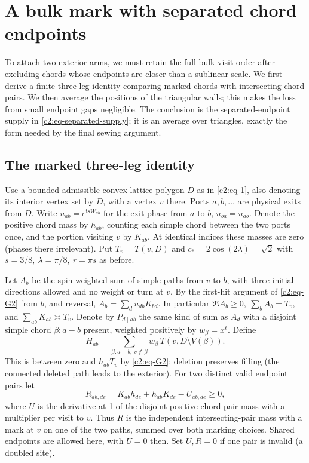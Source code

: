 \section{A bulk mark with separated chord endpoints}\label{c2:separated}

To attach two exterior arms, we must retain the full bulk-visit
order after excluding chords whose endpoints are closer than a sublinear
scale. We first derive a finite three-leg identity comparing marked
chords with intersecting chord pairs. We then average the positions of the
triangular walls; this makes the loss from small endpoint gaps negligible.
The conclusion is the separated-endpoint supply in
\eqref{c2:eq-separated-supply}; it is an average over triangles, exactly
the form needed by the final sewing argument.

\subsection{The marked three-leg identity}
Use a bounded admissible convex lattice polygon \(D\) as in \eqref{c2:eq-1}, also denoting its interior vertex set by \(D\), with a vertex \(v\) there. Ports \(a,b,\ldots\) are physical exits from \(D\). Write \(u_{ab}=e^{\mathrm i s W_{ab}}\) for the exit phase from \(a\) to \(b\), \(u_{ba}=\overline u_{ab}\). Denote the positive chord mass by \(h_{ab}\), counting each simple chord between the two ports once, and the portion visiting \(v\) by \(K_{ab}\). At identical indices these masses are zero (phases there irrelevant). Put \(T_v=T(v,D)\) and \(c_*=2\cos(2\lambda)=\sqrt2\) with \(s=3/8,\ \lambda=\pi/8,\ r=\pi s\) as before.

Let \(A_b\) be the spin-weighted sum of simple paths from \(v\) to \(b\), with three initial directions allowed and no weight or turn at \(v\). By the first-hit argument of \eqref{c2:eq-G2} from \(b\), and reversal, \(A_b=\sum_d u_{db}K_{bd}\). In particular \(\Re A_b\ge0,\ \sum_b A_b=T_v\), and \(\sum_{ab}K_{ab}\asymp T_v\). Denote by \(P_{d\mid ab}\) the same kind of sum as \(A_d\) with a disjoint simple chord \(\beta:a-b\) present, weighted positively by \(w_\beta=x^\ell\). Define
\[
 H_{ab}=\sum_{\beta:a-b,\ v\notin\beta} w_\beta\,T(v,D\setminus V(\beta)).
\]
This is between zero and \(h_{ab}T_v\) by \eqref{c2:eq-G2}; deletion preserves filling (the connected deleted path leads to the exterior). For two distinct valid endpoint pairs let
\[
 R_{ab,de}=K_{ab}h_{de}+h_{ab}K_{de}-U_{ab,de}\ge0 ,
\]
where \(U\) is the derivative at 1 of the disjoint positive chord-pair mass with a multiplier per visit to \(v\). Thus \(R\) is the independent intersecting-pair mass with a mark at \(v\) on one of the two paths, summed over both marking choices. Shared endpoints are allowed here, with \(U=0\) then. Set \(U,R=0\) if one pair is invalid (a doubled site).

